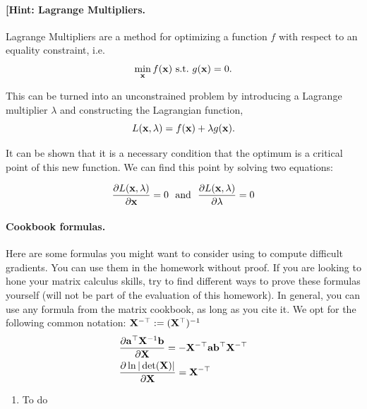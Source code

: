 \documentclass[submit]{harvardml}
\begin{document}
\begin{problem}
\paragraph{[Hint: Lagrange Multipliers.} Lagrange Multipliers are a method for
optimizing a function $f$ with respect to an
equality constraint, i.e. 
\[\min_{\mathbf{x}} f(\mathbf{x})\ \text{s.t.}\ g(\mathbf{x}) = 0.\]

This can be turned into an unconstrained problem by introducing a
Lagrange multiplier $\lambda$ and constructing the Lagrangian function,
\[L(\mathbf{x}, \lambda) =  f(\mathbf{x}) + \lambda g(\mathbf{x}).\]

It can be shown that it is a necessary condition that the optimum 
is a critical point of this new function. We can find this point by solving two equations:

\[\frac{\partial L(\mathbf{x}, \lambda)}{\partial  \mathbf{x}} = 0  \ \ \text{and}\  \  \frac{\partial L(\mathbf{x}, \lambda)}{\partial \lambda} = 0 \]


\paragraph{Cookbook formulas.} Here are some formulas you might want to consider
using to compute difficult gradients. You can use them  in the homework
without proof. If you are looking to hone your matrix calculus skills, try to
find different ways to prove these formulas yourself (will not be part of the
evaluation of this homework). In general, you can use any formula from the matrix cookbook,
as long as you cite it. We opt for the following common notation:
$\mathbf{X}^{-\top} := (\mathbf{X}^{\top})^{-1}$
\begin{align*}
  & \frac{\partial \mathbf{a}^\top \mathbf{X}^{-1} \mathbf{b}}{\partial \mathbf{X}} = - \mathbf{X}^{-\top} \mathbf{a} \mathbf{b}^\top \mathbf{X}^{-\top} \\
  & \frac{\partial \ln | \det (\mathbf{X}) |}{\partial \mathbf{X}} = \mathbf{X}^{-\top}
 \end{align*}
 \end{problem}


\begin{solution}
\begin{sol}
\begin{enumerate}
\item To do
\end{enumerate}
\end{sol}
\end{solution}
\end{document}
